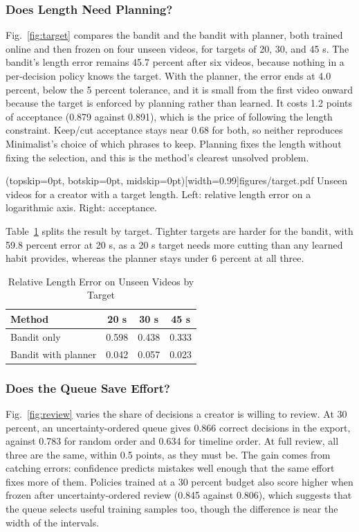\documentclass{ieeeaccess}
\begin{document}
\subsubsection{Does Length Need Planning?}
Fig.~\ref{fig:target} compares the bandit and the bandit with planner, both trained online and then frozen on four unseen videos, for targets of 20, 30, and 45 s. The bandit's length error remains 45.7 percent after six videos, because nothing in a per-decision policy knows the target. With the planner, the error ends at 4.0 percent, below the 5 percent tolerance, and it is small from the first video onward because the target is enforced by planning rather than learned. It costs 1.2 points of acceptance (0.879 against 0.891), which is the price of following the length constraint. Keep/cut acceptance stays near 0.68 for both, so neither reproduces Minimalist's choice of which phrases to keep. Planning fixes the length without fixing the selection, and this is the method's clearest unsolved problem.

\Figure[t!](topskip=0pt, botskip=0pt, midskip=0pt)[width=0.99\columnwidth]{figures/target.pdf}
{Unseen videos for a creator with a target length. Left: relative length error on a logarithmic axis. Right: acceptance.\label{fig:target}}

Table~\ref{tab:target} splits the result by target. Tighter targets are harder for the bandit, with 59.8 percent error at 20 s, as a 20 s target needs more cutting than any learned habit provides, whereas the planner stays under 6 percent at all three.

\begin{table}[t]
\caption{Relative Length Error on Unseen Videos by Target}
\label{tab:target}
\setlength{\tabcolsep}{5pt}
\centering
\begin{tabular}{|l|c|c|c|}
\hline
Method & 20 s & 30 s & 45 s \\
\hline
Bandit only & 0.598 & 0.438 & 0.333 \\
Bandit with planner & 0.042 & 0.057 & 0.023 \\
\hline
\end{tabular}
\end{table}

\subsubsection{Does the Queue Save Effort?}
Fig.~\ref{fig:review} varies the share of decisions a creator is willing to review. At 30 percent, an uncertainty-ordered queue gives 0.866 correct decisions in the export, against 0.783 for random order and 0.634 for timeline order. At full review, all three are the same, within 0.5 points, as they must be. The gain comes from catching errors: confidence predicts mistakes well enough that the same effort fixes more of them. Policies trained at a 30 percent budget also score higher when frozen after uncertainty-ordered review (0.845 against 0.806), which suggests that the queue selects useful training samples too, though the difference is near the width of the intervals.
\end{document}
